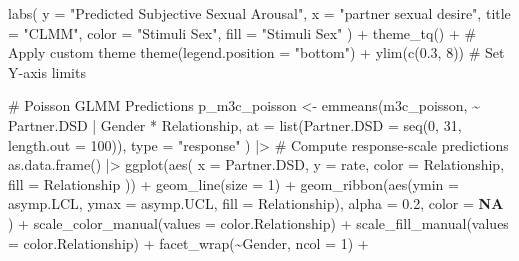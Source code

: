 \documentclass[
  bookmarksnumbered]{article}
\newenvironment{Shaded}{\begin{snugshade}}{\end{snugshade}}
\newcommand{\AttributeTok}[1]{\textcolor[rgb]{0.80,0.80,0.80}{#1}}
\newcommand{\CommentTok}[1]{\textcolor[rgb]{0.50,0.62,0.50}{#1}}
\newcommand{\ConstantTok}[1]{\textcolor[rgb]{0.86,0.64,0.64}{\textbf{#1}}}
\newcommand{\DecValTok}[1]{\textcolor[rgb]{0.86,0.86,0.80}{#1}}
\newcommand{\FloatTok}[1]{\textcolor[rgb]{0.75,0.75,0.82}{#1}}
\newcommand{\FunctionTok}[1]{\textcolor[rgb]{0.94,0.94,0.56}{#1}}
\newcommand{\NormalTok}[1]{\textcolor[rgb]{0.80,0.80,0.80}{#1}}
\newcommand{\OtherTok}[1]{\textcolor[rgb]{0.94,0.94,0.56}{#1}}
\newcommand{\SpecialCharTok}[1]{\textcolor[rgb]{0.86,0.64,0.64}{#1}}
\newcommand{\StringTok}[1]{\textcolor[rgb]{0.80,0.58,0.58}{#1}}
\begin{document}
\begin{Shaded}
\begin{Highlighting}[]
  \FunctionTok{labs}\NormalTok{(}
    \AttributeTok{y =} \StringTok{"Predicted Subjective Sexual Arousal"}\NormalTok{, }\AttributeTok{x =} \StringTok{"partner sexual desire"}\NormalTok{,}
    \AttributeTok{title =} \StringTok{"CLMM"}\NormalTok{,}
    \AttributeTok{color =} \StringTok{"Stimuli Sex"}\NormalTok{, }\AttributeTok{fill =} \StringTok{"Stimuli Sex"}
\NormalTok{  ) }\SpecialCharTok{+}
  \FunctionTok{theme\_tq}\NormalTok{() }\SpecialCharTok{+} \CommentTok{\# Apply custom theme}
  \FunctionTok{theme}\NormalTok{(}\AttributeTok{legend.position =} \StringTok{"bottom"}\NormalTok{) }\SpecialCharTok{+}
  \FunctionTok{ylim}\NormalTok{(}\FunctionTok{c}\NormalTok{(}\FloatTok{0.3}\NormalTok{, }\DecValTok{8}\NormalTok{)) }\CommentTok{\# Set Y{-}axis limits}

\CommentTok{\# Poisson GLMM Predictions}
\NormalTok{p\_m3c\_poisson }\OtherTok{\textless{}{-}} \FunctionTok{emmeans}\NormalTok{(m3c\_poisson, }\SpecialCharTok{\textasciitilde{}}\NormalTok{ Partner.DSD }\SpecialCharTok{|}\NormalTok{ Gender }\SpecialCharTok{*}\NormalTok{ Relationship,}
  \AttributeTok{at =} \FunctionTok{list}\NormalTok{(}\AttributeTok{Partner.DSD =} \FunctionTok{seq}\NormalTok{(}\DecValTok{0}\NormalTok{, }\DecValTok{31}\NormalTok{, }\AttributeTok{length.out =} \DecValTok{100}\NormalTok{)),}
  \AttributeTok{type =} \StringTok{"response"}
\NormalTok{) }\SpecialCharTok{|\textgreater{}} \CommentTok{\# Compute response{-}scale predictions}
  \FunctionTok{as.data.frame}\NormalTok{() }\SpecialCharTok{|\textgreater{}}
  \FunctionTok{ggplot}\NormalTok{(}\FunctionTok{aes}\NormalTok{(}
    \AttributeTok{x =}\NormalTok{ Partner.DSD, }\AttributeTok{y =}\NormalTok{ rate,}
    \AttributeTok{color =}\NormalTok{ Relationship, }\AttributeTok{fill =}\NormalTok{ Relationship}
\NormalTok{  )) }\SpecialCharTok{+}
  \FunctionTok{geom\_line}\NormalTok{(}\AttributeTok{size =} \DecValTok{1}\NormalTok{) }\SpecialCharTok{+}
  \FunctionTok{geom\_ribbon}\NormalTok{(}\FunctionTok{aes}\NormalTok{(}\AttributeTok{ymin =}\NormalTok{ asymp.LCL, }\AttributeTok{ymax =}\NormalTok{ asymp.UCL, }\AttributeTok{fill =}\NormalTok{ Relationship),}
    \AttributeTok{alpha =} \FloatTok{0.2}\NormalTok{, }\AttributeTok{color =} \ConstantTok{NA}
\NormalTok{  ) }\SpecialCharTok{+}
  \FunctionTok{scale\_color\_manual}\NormalTok{(}\AttributeTok{values =}\NormalTok{ color.Relationship) }\SpecialCharTok{+}
  \FunctionTok{scale\_fill\_manual}\NormalTok{(}\AttributeTok{values =}\NormalTok{ color.Relationship) }\SpecialCharTok{+}
  \FunctionTok{facet\_wrap}\NormalTok{(}\SpecialCharTok{\textasciitilde{}}\NormalTok{Gender, }\AttributeTok{ncol =} \DecValTok{1}\NormalTok{) }\SpecialCharTok{+}

\end{Highlighting}
\end{Shaded}
\end{document}
